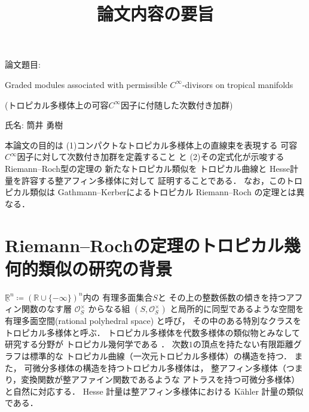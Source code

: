 \documentclass[uplatex,dvipdfmx,12pt]{jsarticle}
\title{論文内容の要旨
}
\date{}
\numberwithin{equation}{section}
\theoremstyle{definition}
\newcommand{\deq}{\coloneqq}
\newcommand{\beforesection}{\vspace{-15pt}}
\newcommand{\aftersection}{\vspace{-8pt}}
\begin{document}
\setlength{\baselineskip}{-5pt}
\setlength{\parskip}{2pt}


\maketitle
{\large
\noindent
論文題目:

Graded modules associated 
with permissible $C^{\infty}$-divisors on tropical manifolds

(トロピカル多様体上の可容$C^{\infty}$因子に付随した次数付き加群)
}

\vspace{5pt}

\noindent
{\large
氏名: 筒井 勇樹
}

\vspace{10pt}

\setlength{\baselineskip}{4pt}
\setlength{\parskip}{3pt}

本論文の目的は
(1)コンパクトなトロピカル多様体上の直線束を表現する
可容$C^{\infty}$因子に対して次数付き加群を定義すること
と
(2)その定式化が示唆するRiemann--Roch型の定理の
新たなトロピカル類似を
トロピカル曲線と
Hesse計量を許容する整アフィン多様体に対して
証明することである．
なお，このトロピカル類似は
Gathmann--Kerberによるトロピカル Riemann--Roch の定理とは異なる．

\beforesection

\section{Riemann--Rochの定理のトロピカル幾何的類似の研究の背景}

\aftersection

$\underline{\mathbb{R}}^{n} \deq (\mathbb{R}\cup\{-\infty\})^{n}$内の
有理多面集合$S$と
その上の整数係数の傾きを持つアフィン関数のなす層 
$\mathcal{O}_S^{\times}$
からなる組
$(S, \mathcal{O}_S^{\times})$
と局所的に同型であるような空間を
有理多面空間(rational polyhedral space)
と呼び，
その中のある特別なクラスをトロピカル多様体と呼ぶ．
トロピカル多様体を代数多様体の類似物とみなして研究する分野が
トロピカル幾何学である
\cite{mikhalkinTropicalEigenwaveIntermediate2014a,
gross2019sheaftheoretic}．
次数$1$の頂点を持たない有限距離グラフは標準的な
トロピカル曲線（一次元トロピカル多様体）の構造を持つ．
また，
可微分多様体の構造を持つトロピカル多様体は，
整アフィン多様体（つまり，変換関数が整アファイン関数であるような
アトラスを持つ可微分多様体）と自然に対応する．
Hesse 計量は整アフィン多様体における
K\"ahler 計量の類似である．
\end{document}

